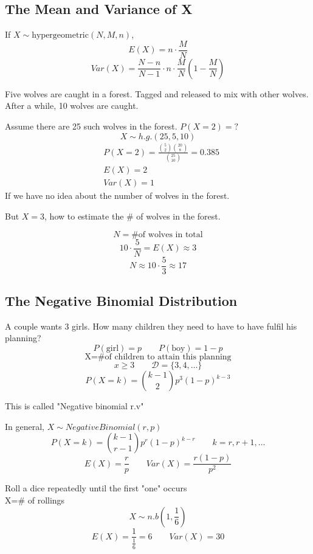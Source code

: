\subsection{The Mean and Variance of X}
\begin{prop}
If $X \sim \text{hypergeometric}(N,M,n)$,
\[E(X)=n \cdot \frac{M}{N}\]
\[Var(X)=\frac{N-n}{N-1}\cdot n \cdot\frac{M}{N}\left(1-\frac{M}{N}\right)\]
\end{prop}

\begin{exmp}
Five wolves are caught in a forest. Tagged and released to mix with other wolves. After a while, 10 wolves are caught.

Assume there are 25 such wolves in the forest. $P(X=2)=?$
\[X \sim h.g.(25,5,10)\]
\begin{align*}
&P(X=2)=\frac{\binom 52 \binom {20}{8}}{\binom {25}{10}}=0.385 \\
&E(X)=2	\\
&Var(X)=1
\end{align*}
If we have no idea about the number of wolves in the forest.

But $X=3$, how to estimate the \# of wolves in the forest.

\[N= \text{\# of wolves in total}\]
\[10 \cdot \frac{5}{N}=E(X)\approx 3\]
\[N \approx 10 \cdot \frac{5}{3}\approx17\]
\end{exmp}

\subsection{The Negative Binomial Distribution}
\begin{exmp}
A couple wants 3 girls. How many children they need to have to have fulfil his planning?
\[P(\text{girl})=p \qquad P(\text{boy})=1-p\]
\[\text{X=\# of children to attain this planning}\]
\[x\geq 3 \qquad \mathcal{D}=\{3,4,\dots\}\]
\[P(X=k)=\binom {k-1}{2} p^3(1-p)^{k-3}\]

This is called "Negative binomial r.v"
\end{exmp}

\begin{prop}
In general, $X \sim NegativeBinomial(r,p)$
\[P(X=k)=\binom {k-1}{r-1} p^r (1-p)^{k-r}  \qquad k=r,r+1,\dots	\]
\[E(X)=\frac{r}{p} \qquad  Var(X)=\frac{r(1-p)}{p^2} \]
\end{prop}

\begin{exmp}
Roll a dice repeatedly until the first "one" occurs\\
X=\# of rollings
\[X \sim n.b(1,\frac{1}{6})\]
\[E(X)=\frac{1}{\frac{1}{6}}=6  	\qquad Var(X)=30\]
\end{exmp}

